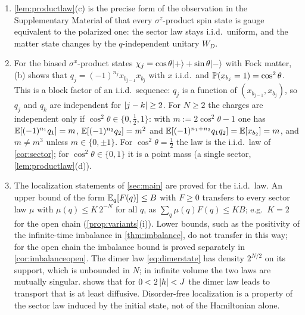 \begin{remark}\label{rem:productlaws}
\leavevmode
\begin{enumerate}[label=(\alph*)]
\item \cref{lem:productlaw}(c) is the precise form of the observation in the Supplementary Material of
\cite{SKKM2017} that every $\sigma^z$-product spin state is gauge equivalent to the polarized one:
the sector law stays i.i.d.\ uniform, and the matter state changes by the $q$-independent unitary
$W_D$.
\item For the biased $\sigma^x$-product states $\chi_j=\cos\theta|+\rangle+\sin\theta|-\rangle$ with Fock
matter, (b) shows that $q_j=(-1)^{n_j}x_{b_{j-1}}x_{b_j}$ with $x$ i.i.d.\ and
$\mathbb{P}(x_{b_j}=1)=\cos^2\theta$.  This is a block factor of an i.i.d.\ sequence: $q_j$ is a function of
$(x_{b_{j-1}},x_{b_j})$, so $q_j$ and $q_k$ are independent for $\left|j-k\right|\ge2$.  For $N\ge2$ the charges are
independent only if $\cos^2\theta\in\{0,\tfrac12,1\}$: with $m:=2\cos^2\theta-1$ one has
$\mathbb{E}[(-1)^{n_1}q_1]=m$, $\mathbb{E}[(-1)^{n_2}q_2]=m^2$ and $\mathbb{E}[(-1)^{n_1+n_2}q_1q_2]=\mathbb{E}[x_{b_2}]=m$, and $m\neq m^3$
unless $m\in\{0,\pm1\}$.  For $\cos^2\theta=\tfrac12$ the law is the i.i.d.\ law of \cref{cor:sector}; for
$\cos^2\theta\in\{0,1\}$ it is a point mass (a single sector, \cref{lem:productlaw}(d)).
\item The localization statements of \cref{sec:main} are proved for the i.i.d.\ law.  An upper bound of
the form $\mathbb{E}_q[F(q)]\le B$ with $F\ge0$ transfers to every sector law $\mu$ with $\mu(q)\le K\,2^{-N}$ for all
$q$, as $\sum_q\mu(q)F(q)\le KB$; e.g.\ $K=2$ for the open chain (\cref{prop:variants}(i)).  Lower bounds,
such as the positivity of the infinite-time imbalance in \cref{thm:imbalance}, do not transfer in this
way; for the open chain the imbalance bound is proved separately in \cref{cor:imbalanceopen}.  The dimer law \eqref{eq:dimerstate} has density $2^{N/2}$ on its support, which is unbounded in $N$;
in infinite volume the two laws are mutually singular.
 shows that for $0<2\left|h\right|<J$ the dimer law leads to transport that is at least diffusive.
Disorder-free localization is a property of the sector law induced by the initial state, not of the
Hamiltonian alone.
\end{enumerate}
\end{remark}

